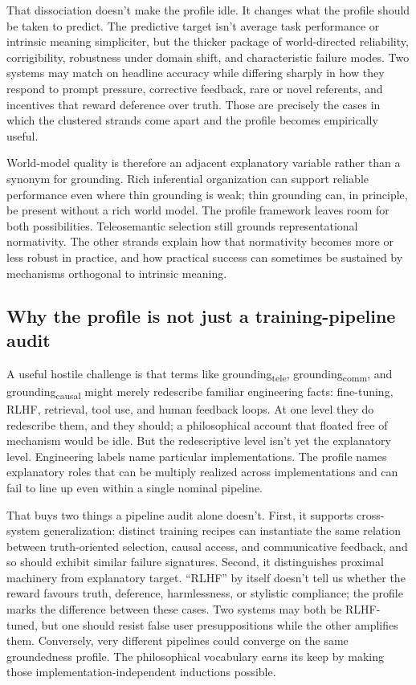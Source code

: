 \documentclass[12pt]{article}
\newcommand{\gtele}{grounding\textsubscript{tele}}
\newcommand{\gcausal}{grounding\textsubscript{causal}}
\newcommand{\gcomm}{grounding\textsubscript{comm}}
\begin{document}
That dissociation doesn't make the profile idle. It changes what the profile should be taken to predict. The predictive target isn't average task performance or intrinsic meaning simpliciter, but the thicker package of world-directed reliability, corrigibility, robustness under domain shift, and characteristic failure modes. Two systems may match on headline accuracy while differing sharply in how they respond to prompt pressure, corrective feedback, rare or novel referents, and incentives that reward deference over truth. Those are precisely the cases in which the clustered strands come apart and the profile becomes empirically useful.

World-model quality is therefore an adjacent explanatory variable rather than a synonym for grounding. Rich inferential organization can support reliable performance even where thin grounding is weak; thin grounding can, in principle, be present without a rich world model. The profile framework leaves room for both possibilities. Teleosemantic selection still grounds representational normativity. The other strands explain how that normativity becomes more or less robust in practice, and how practical success can sometimes be sustained by mechanisms orthogonal to intrinsic meaning.

\subsection{Why the profile is not just a training-pipeline audit}
\label{sec:not-just-pipeline}

A useful hostile challenge is that terms like \gtele{}, \gcomm{}, and \gcausal{} might merely redescribe familiar engineering facts: fine-tuning, RLHF, retrieval, tool use, and human feedback loops. At one level they do redescribe them, and they should; a philosophical account that floated free of mechanism would be idle. But the redescriptive level isn't yet the explanatory level. Engineering labels name particular implementations. The profile names explanatory roles that can be multiply realized across implementations and can fail to line up even within a single nominal pipeline.

That buys two things a pipeline audit alone doesn't. First, it supports cross-system generalization: distinct training recipes can instantiate the same relation between truth-oriented selection, causal access, and communicative feedback, and so should exhibit similar failure signatures. Second, it distinguishes proximal machinery from explanatory target. \enquote{RLHF} by itself doesn't tell us whether the reward favours truth, deference, harmlessness, or stylistic compliance; the profile marks the difference between these cases. Two systems may both be RLHF-tuned, but one should resist false user presuppositions while the other amplifies them. Conversely, very different pipelines could converge on the same groundedness profile. The philosophical vocabulary earns its keep by making those implementation-independent inductions possible.
\end{document}
